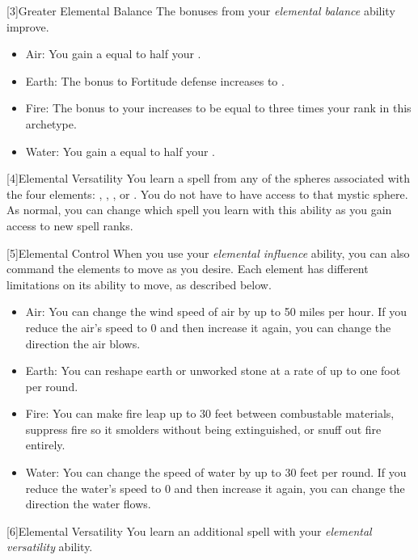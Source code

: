         [3]{Greater Elemental Balance} The bonuses from your \textit{elemental balance} ability improve.
        \begin{itemize}
            \item Air: You gain a  equal to half your .
            \item Earth: The bonus to Fortitude defense increases to .
            \item Fire: The bonus to your  increases to be equal to three times your rank in this archetype.
            \item Water: You gain a  equal to half your .
        \end{itemize}

        [4]{Elemental Versatility} You learn a spell from any of the spheres associated with the four elements: , , , or .
        You do not have to have access to that mystic sphere.
        As normal, you can change which spell you learn with this ability as you gain access to new spell ranks.

        [5]{Elemental Control} When you use your \textit{elemental influence} ability, you can also command the elements to move as you desire.
        Each element has different limitations on its ability to move, as described below.
        \begin{itemize}
            \item Air: You can change the wind speed of air by up to 50 miles per hour.
                If you reduce the air's speed to 0 and then increase it again, you can change the direction the air blows.
            \item Earth: You can reshape earth or unworked stone at a rate of up to one foot per round.
            \item Fire: You can make fire leap up to 30 feet between combustable materials, suppress fire so it smolders without being extinguished, or snuff out fire entirely.
            \item Water: You can change the speed of water by up to 30 feet per round.
                If you reduce the water's speed to 0 and then increase it again, you can change the direction the water flows.
        \end{itemize}

        [6]{Elemental Versatility} You learn an additional spell with your \textit{elemental versatility} ability.

